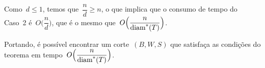 	Como~$d\le1$, temos que~$\dfrac{n}{d}\ge n$, o que implica que o
	consumo de tempo do Caso~2 é~$O\Big(\dfrac{n}{d}\Big)$, que 
	é o mesmo que~$O\Big(\dfrac{n}{\mathrm{diam}^*(T)}\Big)$.

	Portando, é possível encontrar um corte~$(B,W,S)$
	que satisfaça as condições do teorema em 
	tempo~$O\Big(\dfrac{n}{\mathrm{diam}^*(T)}\Big)$.







